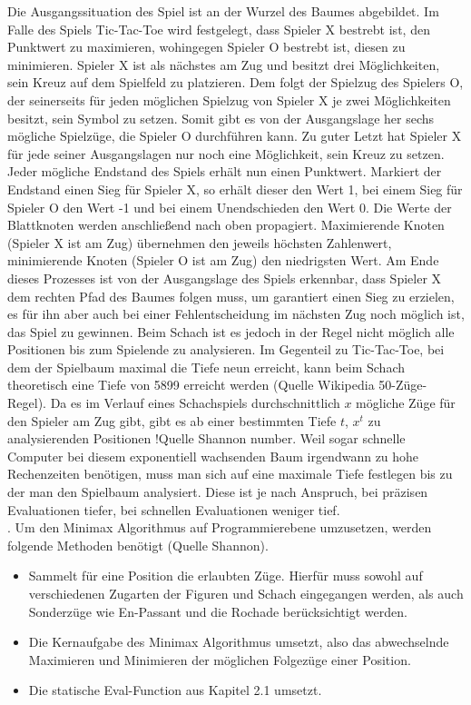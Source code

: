 Die Ausgangssituation des Spiel ist an der Wurzel des Baumes abgebildet.
Im Falle des Spiels Tic-Tac-Toe wird festgelegt, dass Spieler X bestrebt ist, den Punktwert zu maximieren, wohingegen Spieler O bestrebt ist, diesen zu minimieren.
Spieler X ist als nächstes am Zug und besitzt drei Möglichkeiten, sein Kreuz auf dem Spielfeld zu platzieren.
Dem folgt der Spielzug des Spielers O, der seinerseits für jeden möglichen Spielzug von Spieler X je zwei Möglichkeiten besitzt, sein Symbol zu setzen.
Somit gibt es von der Ausgangslage her sechs mögliche Spielzüge, die Spieler O durchführen kann.
Zu guter Letzt hat Spieler X für jede seiner Ausgangslagen nur noch eine Möglichkeit, sein Kreuz zu setzen.
Jeder mögliche Endstand des Spiels erhält nun einen Punktwert.
Markiert der Endstand einen Sieg für Spieler X, so erhält dieser den Wert 1, bei einem Sieg für Spieler O den Wert -1 und bei einem Unendschieden den Wert 0.
Die Werte der Blattknoten werden anschließend nach oben propagiert.
Maximierende Knoten (Spieler X ist am Zug) übernehmen den jeweils höchsten Zahlenwert, minimierende Knoten (Spieler O ist am Zug) den niedrigsten Wert.
Am Ende dieses Prozesses ist von der Ausgangslage des Spiels erkennbar, dass Spieler X dem rechten Pfad des Baumes folgen muss, um garantiert einen Sieg zu erzielen, es für ihn aber auch bei einer Fehlentscheidung im nächsten Zug noch möglich ist, das Spiel zu gewinnen.
Beim Schach ist es jedoch in der Regel nicht möglich alle Positionen bis zum Spielende zu analysieren. Im Gegenteil zu Tic-Tac-Toe, bei dem der Spielbaum maximal die Tiefe neun erreicht, kann beim Schach theoretisch eine Tiefe von 5899 erreicht werden (Quelle Wikipedia 50-Züge-Regel).
Da es im Verlauf eines Schachspiels durchschnittlich $x$ mögliche Züge für den Spieler am Zug gibt, gibt es ab einer bestimmten Tiefe $t$, $x^t$ zu analysierenden Positionen !Quelle Shannon number. Weil sogar schnelle Computer bei diesem exponentiell wachsenden Baum irgendwann zu hohe Rechenzeiten benötigen, muss man sich auf eine maximale Tiefe festlegen bis zu der man den Spielbaum analysiert. Diese ist je nach Anspruch, bei präzisen Evaluationen tiefer, bei schnellen Evaluationen weniger tief.\\.
Um den Minimax Algorithmus auf Programmierebene umzusetzen, werden folgende Methoden benötigt (Quelle Shannon).
\begin{itemize}
    \item Sammelt für eine Position die erlaubten Züge. Hierfür muss sowohl auf verschiedenen Zugarten der Figuren und Schach eingegangen werden, als auch Sonderzüge wie En-Passant und die Rochade berücksichtigt werden.
    \item Die Kernaufgabe des Minimax Algorithmus umsetzt, also das abwechselnde Maximieren und Minimieren der möglichen Folgezüge einer Position.
    \item Die statische Eval-Function aus Kapitel 2.1 umsetzt.
\end{itemize}
